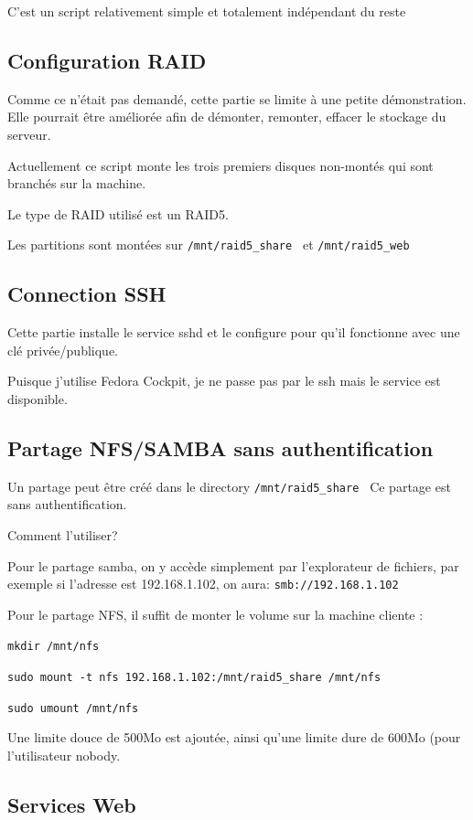 \documentclass{article}
\begin{document}
C'est un script relativement simple et totalement indépendant du reste

\subsection{Configuration RAID}

Comme ce n'était pas demandé, cette partie se limite à une petite démonstration. Elle pourrait être améliorée afin de démonter, remonter, effacer le stockage du serveur.

Actuellement ce script monte les trois premiers disques non-montés qui sont branchés sur la machine.

Le type de RAID utilisé est un RAID5.

Les partitions sont montées sur \texttt{/mnt/raid5\_share } et \texttt{/mnt/raid5\_web } 

\subsection{Connection SSH}

Cette partie installe le service sshd et le configure pour qu'il fonctionne avec une clé privée/publique.

Puisque j'utilise Fedora Cockpit, je ne passe pas par le ssh mais le service est disponible.

\subsection{Partage NFS/SAMBA sans authentification}

Un partage peut être créé dans le directory \texttt{/mnt/raid5\_share } 
Ce partage est sans authentification.

Comment l'utiliser? 

Pour le partage samba, on y accède simplement par l'explorateur de fichiers, par exemple si l'adresse est 192.168.1.102, on aura: \texttt{smb://192.168.1.102}

Pour le partage NFS, il suffit de monter le volume sur la machine cliente : 


\texttt{mkdir /mnt/nfs}


\texttt{sudo mount -t nfs 192.168.1.102:/mnt/raid5\_share /mnt/nfs}


\texttt{sudo umount /mnt/nfs}

Une limite douce de 500Mo est ajoutée, ainsi qu'une limite dure de 600Mo (pour l'utilisateur nobody.

\subsection{Services Web}
\end{document}
